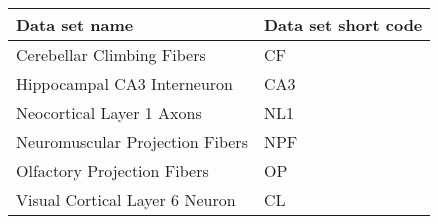 \begin{tabular}{|l|l|}
	\hline
	Data set name		   & Data set short code \\\hline
	Cerebellar Climbing Fibers      & CF		  \\\hline
	Hippocampal CA3 Interneuron     & CA3		 \\\hline
	Neocortical Layer 1 Axons       & NL1		 \\\hline
	Neuromuscular Projection Fibers & NPF		 \\\hline
	Olfactory Projection Fibers     & OP		  \\\hline
	Visual Cortical Layer 6 Neuron  & CL		  \\\hline
\end{tabular}
